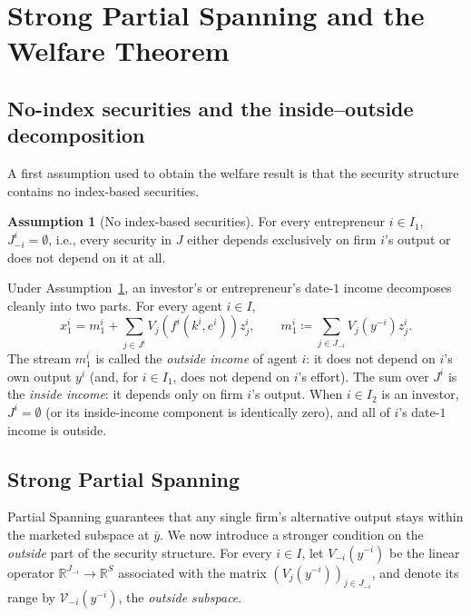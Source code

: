 \documentclass[11pt,a4paper,oneside]{book}
\def\R{\mathbb{R}}
\theoremstyle{plain}
\theoremstyle{definition}
\newtheorem{assumption}[theorem]{Assumption}
\theoremstyle{remark}
\numberwithin{equation}{chapter}
\begin{document}
\section{Strong Partial Spanning and the Welfare Theorem}
\label{sec:MH-welfare}

\subsection{No-index securities and the inside--outside decomposition}

A first assumption used to obtain the welfare result is that the security structure contains no index-based securities.

\begin{assumption}[No index-based securities]\label{ass:no-index}
For every entrepreneur $i \in I_1$, $J^i_{-i} = \emptyset$, i.e., every security in $J$ either depends exclusively on firm $i$'s output or does not depend on it at all.
\end{assumption}

Under Assumption~\ref{ass:no-index}, an investor's or entrepreneur's date-$1$ income decomposes cleanly into two parts.
For every agent $i \in I$,
\begin{equation}\label{eq:inside-outside}
  x^i_1 = m^i_1 + \sum_{j \in J^i} V_j(f^i(k^i, e^i)) z^i_j,
  \qquad
  m^i_1 \coloneqq \sum_{j \in J_{-i}} V_j(y^{-i}) z^i_j.
\end{equation}
The stream $m^i_1$ is called the \emph{outside income} of agent $i$: it does not depend on $i$'s own output $y^i$ (and, for $i \in I_1$, does not depend on $i$'s effort).
The sum over $J^i$ is the \emph{inside income}: it depends only on firm $i$'s output.
When $i \in I_2$ is an investor, $J^i = \emptyset$ (or its inside-income component is identically zero), and all of $i$'s date-$1$ income is outside.

\subsection{Strong Partial Spanning}

Partial Spanning guarantees that any single firm's alternative output stays within the marketed subspace at $\overline{y}$.
We now introduce a stronger condition on the \emph{outside} part of the security structure.
For every $i \in I$, let $V_{-i}(y^{-i})$ be the linear operator $\R^{J_{-i}} \to \R^S$ associated with the matrix $(V_j(y^{-i}))_{j \in J_{-i}}$, and denote its range by $\mathcal{V}_{-i}(y^{-i})$, the \emph{outside subspace}.
\end{document}

